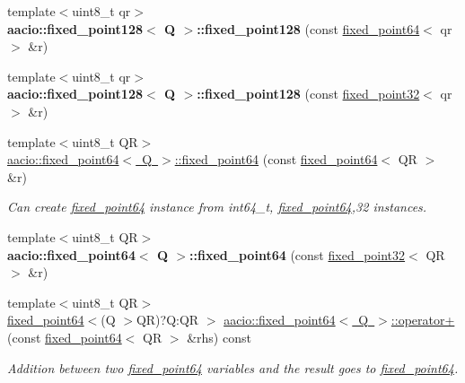 \begin{DoxyCompactItemize}
\mbox{\label{group__fixedpoint_ga7297f006c904254404909d541107160a}} 
{\footnotesize template$<$uint8\+\_\+t qr$>$ }\\{\bfseries aacio\+::fixed\+\_\+point128$<$ Q $>$\+::fixed\+\_\+point128} (const \mbox{\hyperlink{structaacio_1_1fixed__point64}{fixed\+\_\+point64}}$<$ qr $>$ \&r)
\item 
\mbox{\label{group__fixedpoint_ga33a72d30c22b4f41add6f5dca2945c44}} 
{\footnotesize template$<$uint8\+\_\+t qr$>$ }\\{\bfseries aacio\+::fixed\+\_\+point128$<$ Q $>$\+::fixed\+\_\+point128} (const \mbox{\hyperlink{structaacio_1_1fixed__point32}{fixed\+\_\+point32}}$<$ qr $>$ \&r)
\item 
{\footnotesize template$<$uint8\+\_\+t QR$>$ }\\\mbox{\hyperlink{group__fixedpoint_ga998ecf508857149cd2782eed7683d327}{aacio\+::fixed\+\_\+point64$<$ Q $>$\+::fixed\+\_\+point64}} (const \mbox{\hyperlink{structaacio_1_1fixed__point64}{fixed\+\_\+point64}}$<$ QR $>$ \&r)
\begin{DoxyCompactList}\small\item\em Can create \mbox{\hyperlink{structaacio_1_1fixed__point64}{fixed\+\_\+point64}} instance from int64\+\_\+t, \mbox{\hyperlink{structaacio_1_1fixed__point64}{fixed\+\_\+point64}},32 instances. \end{DoxyCompactList}\item 
\mbox{\label{group__fixedpoint_ga13b078ee9ced819b74acc075d30c581f}} 
{\footnotesize template$<$uint8\+\_\+t QR$>$ }\\{\bfseries aacio\+::fixed\+\_\+point64$<$ Q $>$\+::fixed\+\_\+point64} (const \mbox{\hyperlink{structaacio_1_1fixed__point32}{fixed\+\_\+point32}}$<$ QR $>$ \&r)
\item 
{\footnotesize template$<$uint8\+\_\+t QR$>$ }\\\mbox{\hyperlink{structaacio_1_1fixed__point64}{fixed\+\_\+point64}}$<$(Q $>$QR)?Q\+:\+QR $>$ \mbox{\hyperlink{group__fixedpoint_ga83a7a788aa4fd2cec63111176dd9332f}{aacio\+::fixed\+\_\+point64$<$ Q $>$\+::operator+}} (const \mbox{\hyperlink{structaacio_1_1fixed__point64}{fixed\+\_\+point64}}$<$ QR $>$ \&rhs) const
\begin{DoxyCompactList}\small\item\em Addition between two \mbox{\hyperlink{structaacio_1_1fixed__point64}{fixed\+\_\+point64}} variables and the result goes to \mbox{\hyperlink{structaacio_1_1fixed__point64}{fixed\+\_\+point64}}. \end{DoxyCompactList}\item 

\end{DoxyCompactItemize}
